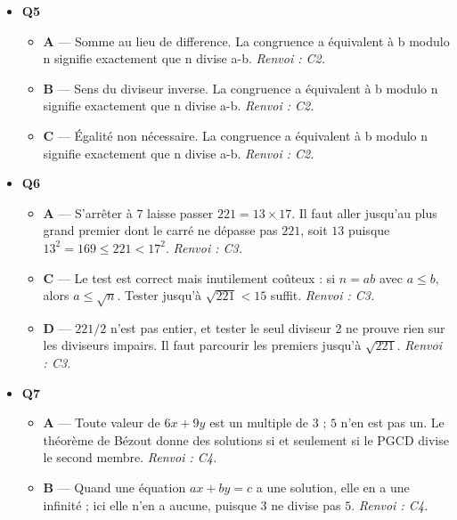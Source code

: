 \begin{itemize}
\begin{itemize}
    \item \textbf{B} — Produit égal a 1. Le théorème de Bézout caractérise la coprimalité par l'existence de u,v entiers tels que au+bv=1. \emph{Renvoi : C5.}
    \item \textbf{D} — Équation homogene. Le théorème de Bézout caractérise la coprimalité par l'existence de u,v entiers tels que au+bv=1. \emph{Renvoi : C5.}
  \end{itemize}
  \item \textbf{Q5}
  \begin{itemize}
    \item \textbf{A} — Somme au lieu de difference. La congruence a équivalent à b modulo n signifie exactement que n divise a-b. \emph{Renvoi : C2.}
    \item \textbf{B} — Sens du diviseur inverse. La congruence a équivalent à b modulo n signifie exactement que n divise a-b. \emph{Renvoi : C2.}
    \item \textbf{C} — Égalité non nécessaire. La congruence a équivalent à b modulo n signifie exactement que n divise a-b. \emph{Renvoi : C2.}
  \end{itemize}
  \item \textbf{Q6}
  \begin{itemize}
    \item \textbf{A} — S'arrêter à $7$ laisse passer $221=13\times17$. Il faut aller jusqu'au plus grand premier dont le carré ne dépasse pas $221$, soit $13$ puisque $13^2=169\leq221<17^2$. \emph{Renvoi : C3.}
    \item \textbf{C} — Le test est correct mais inutilement coûteux : si $n=ab$ avec $a\leq b$, alors $a\leq\sqrt n$. Tester jusqu'à $\sqrt{221}<15$ suffit. \emph{Renvoi : C3.}
    \item \textbf{D} — $221/2$ n'est pas entier, et tester le seul diviseur $2$ ne prouve rien sur les diviseurs impairs. Il faut parcourir les premiers jusqu'à $\sqrt{221}$. \emph{Renvoi : C3.}
  \end{itemize}
  \item \textbf{Q7}
  \begin{itemize}
    \item \textbf{A} — Toute valeur de $6x+9y$ est un multiple de $3$ ; $5$ n'en est pas un. Le théorème de Bézout donne des solutions si et seulement si le PGCD divise le second membre. \emph{Renvoi : C4.}
    \item \textbf{B} — Quand une équation $ax+by=c$ a une solution, elle en a une infinité ; ici elle n'en a aucune, puisque $3$ ne divise pas $5$. \emph{Renvoi : C4.}

\end{itemize}
\end{itemize}
